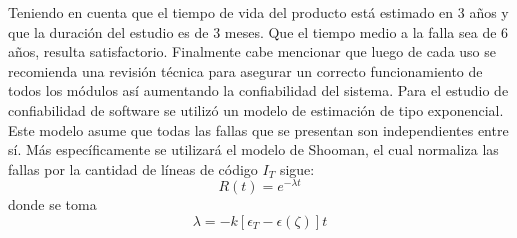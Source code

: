 Teniendo en cuenta que el tiempo de vida del producto está estimado en 3 años y que la duración del estudio es de 3 meses. Que el tiempo medio a la falla sea de 6 años, resulta satisfactorio.
Finalmente cabe mencionar que luego de cada uso se recomienda una revisión técnica para asegurar un correcto funcionamiento de todos los módulos así aumentando la confiabilidad del sistema.
Para el estudio de confiabilidad de software se utilizó un modelo de estimación de tipo exponencial. Este modelo asume que todas las fallas que se presentan son independientes entre sí. Más específicamente se utilizará el modelo de Shooman, el cual normaliza las fallas por la cantidad de líneas de código $I_T$ sigue:
\begin{equation}
	R(t) = e^{-\lambda t}
\end{equation}
donde se toma
\begin{equation}
	\lambda = -k \left[ \epsilon_T - \epsilon(\zeta) \right]t
\end{equation}

